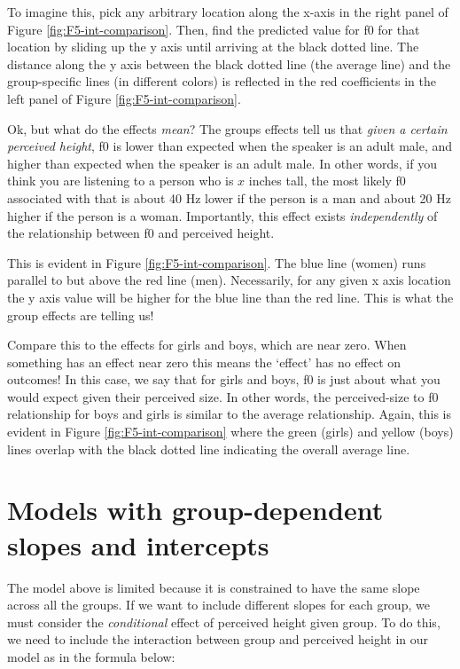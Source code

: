 \documentclass[
]{book}
\begin{document}
To imagine this, pick any arbitrary location along the x-axis in the right panel of Figure \ref{fig:F5-int-comparison}. Then, find the predicted value for f0 for that location by sliding up the y axis until arriving at the black dotted line. The distance along the y axis between the black dotted line (the average line) and the group-specific lines (in different colors) is reflected in the red coefficients in the left panel of Figure \ref{fig:F5-int-comparison}.

Ok, but what do the effects \emph{mean}? The groups effects tell us that \emph{given a certain perceived height}, f0 is lower than expected when the speaker is an adult male, and higher than expected when the speaker is an adult male. In other words, if you think you are listening to a person who is \(x\) inches tall, the most likely f0 associated with that is about 40 Hz lower if the person is a man and about 20 Hz higher if the person is a woman. Importantly, this effect exists \emph{independently} of the relationship between f0 and perceived height.

This is evident in Figure \ref{fig:F5-int-comparison}. The blue line (women) runs parallel to but above the red line (men). Necessarily, for any given x axis location the y axis value will be higher for the blue line than the red line. This is what the group effects are telling us!

Compare this to the effects for girls and boys, which are near zero. When something has an effect near zero this means the `effect' has no effect on outcomes! In this case, we say that for girls and boys, f0 is just about what you would expect given their perceived size. In other words, the perceived-size to f0 relationship for boys and girls is similar to the average relationship. Again, this is evident in Figure \ref{fig:F5-int-comparison} where the green (girls) and yellow (boys) lines overlap with the black dotted line indicating the overall average line.

\hypertarget{models-with-group-dependent-slopes-and-intercepts}{%
\section{Models with group-dependent slopes and intercepts}\label{models-with-group-dependent-slopes-and-intercepts}}

The model above is limited because it is constrained to have the same slope across all the groups. If we want to include different slopes for each group, we must consider the \emph{conditional} effect of perceived height given group. To do this, we need to include the interaction between group and perceived height in our model as in the formula below:
\end{document}
